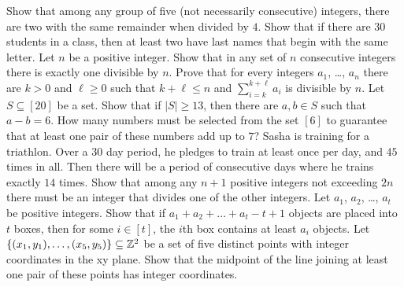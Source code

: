 \begin{chapterendexercises}
  \exercise Show that among any group of five (not necessarily consecutive)
    integers, there are two with the same remainder when divided by $4$.
  \exercise Show that if there are 30 students in a class, then at least
    two have last names that begin with the same letter.
  \exercise Let $n$ be a positive integer. Show that in any set of $n$
    consecutive integers there is exactly one divisible by $n$.
  \exercise Prove that for every integers $a_1$, \dots, $a_n$ there are
    $k > 0$ and $\ell \ge 0$ such that $k + \ell \le n$ and
    $\sum_{i = k}^{k + \ell} a_i$ is divisible by $n$.
  \exercise Let $S \subseteq [20]$ be a set. Show that if
    $|S| \ge 13$, then there are $a, b \in S$ such that $a - b = 6$.
  \exercise How many numbers must be selected from the set $[6]$ to
    guarantee that at least one pair of these numbers add up to $7$?
  \exercise Sasha is training for a triathlon. Over a $30$ day period, he
    pledges to train at least once per day, and $45$ times in all. Then there
    will be a period of consecutive days where he trains exactly $14$ times.
  \exercise Show that among any $n + 1$ positive integers not exceeding $2n$
    there must be an integer that divides one of the other integers.
  \exercise Let $a_1$, $a_2$, \dots, $a_t$ be positive integers. Show that
    if $a_1 + a_2 + \dots + a_t - t + 1$ objects are placed into $t$ boxes,
    then for some $i \in [t]$, the $i$th box contains at least $a_i$ objects.
  \exercise Let $\set{(x_1,y_1), \dots, (x_5, y_5)} \subseteq \Z^2$ be a
    set of five distinct points with integer coordinates in the xy plane. Show
    that the midpoint of the line joining at least one pair of these points has
    integer coordinates.
\end{chapterendexercises}
